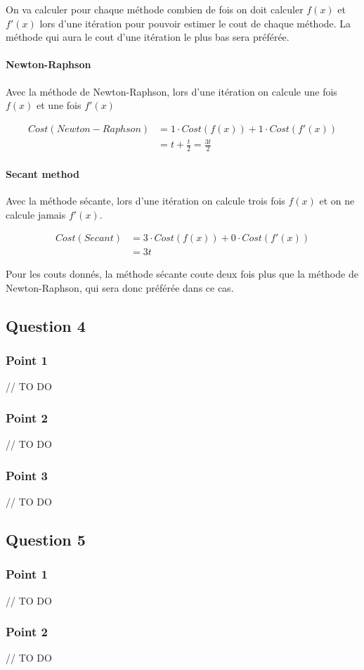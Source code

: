 On va calculer pour chaque méthode combien de fois on doit calculer $f(x)$ et $f'(x)$ lors d'une itération pour pouvoir estimer le cout de chaque méthode. La méthode qui aura le cout d'une itération le plus bas sera préférée.

\paragraph{Newton-Raphson}Avec la méthode de Newton-Raphson, lors d'une itération on calcule une fois $f(x)$ et une fois $f'(x)$

\begin{equation}
	\begin{aligned}
		Cost(Newton-Raphson) &= 1 \cdot Cost(f(x)) + 1 \cdot Cost(f'(x))\\
		&= t + \frac{t}{2} = \frac{3t}{2}
	\end{aligned}
\end{equation}

\paragraph{Secant method}Avec la méthode sécante, lors d'une itération on calcule trois fois $f(x)$ et on ne calcule jamais $f'(x)$.

\begin{equation}
	\begin{aligned}
		Cost(Secant) &= 3 \cdot Cost(f(x)) + 0 \cdot Cost(f'(x))\\
		&= 3t
	\end{aligned}
\end{equation}

Pour les couts donnés, la méthode sécante coute deux fois plus que la méthode de Newton-Raphson, qui sera donc préférée dans ce cas.

\subsection{Question 4}

\subsubsection{Point 1}

// TO DO

\subsubsection{Point 2}

// TO DO

\subsubsection{Point 3}

// TO DO

\subsection{Question 5}

\subsubsection{Point 1}

// TO DO

\subsubsection{Point 2}

// TO DO